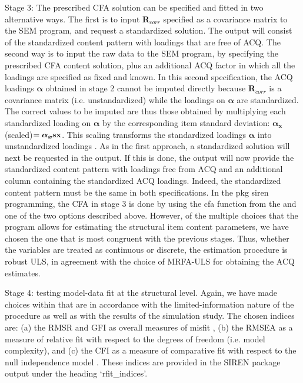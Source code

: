 Stage 3: The prescribed CFA solution can be specified and fitted in two alternative ways. The first is to input $\mathbf{R}_{corr}$ specified as a covariance matrix to the SEM program, and request a standardized solution. The output will consist of the standardized content pattern with loadings that are free of ACQ. The second way is to input the raw data to the SEM program, by specifying the prescribed CFA content solution, plus an additional ACQ factor in which all the loadings are specified as fixed and known. In this second specification, the ACQ loadings $\boldsymbol{\alpha}$ obtained in stage 2 cannot be imputed directly because $\mathbf{R}_{corr}$ is a covariance matrix (i.e. unstandardized) while the loadings on $\boldsymbol{\alpha}$ are standardized. The correct values to be imputed are thus those obtained by multiplying each standardized loading on $\boldsymbol{\alpha}$  by the corresponding item standard deviation: $\boldsymbol{\alpha_{x}}$(scaled)$=\boldsymbol{\alpha_{x}}\bf{sx}$. This scaling transforms the standardized loadings $\boldsymbol{\alpha}$ into unstandardized loadings \citep[e.g.][]{Bollen:1989}. As in the first approach, a standardized solution will next be requested in the output. If this is done, the output will now  provide the standardized content pattern with loadings free from ACQ and an additional column containing the standardized ACQ loadings. Indeed, the standardized content pattern must be the same in both specifications. In the pkg {siren} programming, the CFA in stage 3 is done by using the cfa function from the  and one of the two options described above. However, of the multiple choices that the program allows for estimating the structural item content parameters, we have chosen the one that is most congruent with the previous stages. Thus, whether the variables are treated as continuous or discrete, the estimation procedure is robust ULS, in agreement with the choice of MRFA-ULS for obtaining the ACQ estimates.

Stage 4: testing model-data fit at the structural level. Again, we have made choices within  that are in accordance with the limited-information nature of the procedure as well as with the results of the simulation study. The chosen indices are: (a) the RMSR and GFI as overall measures of misfit \citep{McDonald:1995}, (b) the RMSEA as a measure of relative fit with respect to the degrees of freedom (i.e. model complexity), and (c) the CFI as a measure of comparative fit with respect to the null independence model \citep[see][for points b and c]{Tanaka:1993}. These indices are provided in the SIREN package output under the heading ‘rfit\_indices’.

